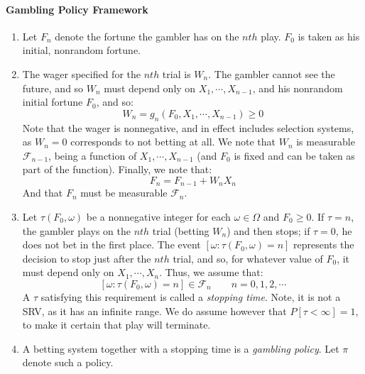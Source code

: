 \documentclass[12pt,a4paper]{article}
\newcommand{\1}[1]{\mathbbm{1}\left\{ #1 \right\}}
\newcommand{\fcal}{\mathcal{F}}
\begin{document}
\paragraph{Gambling Policy Framework}
\begin{enumerate}
	\item Let $F_n$ denote the fortune the gambler has on the $nth$ play. $F_0$ is taken as his initial, nonrandom fortune.
	
	\item The wager specified for the $nth$ trial is $W_n$. The gambler cannot see the future, and so $W_n$ must depend only on $X_1, \cdots, X_{n-1}$, and his nonrandom initial fortune $F_0$, and so:
	$$
		W_n = g_n(F_0, X_1, \cdots, X_{n-1}) \geq 0
	$$
	Note that the wager is nonnegative, and in effect includes selection systems, as $W_n = 0$ corresponds to not betting at all. We note that $W_n$ is measurable $\fcal_{n-1}$, being a function of $X_1, \cdots, X_{n-1}$ (and $F_0$ is fixed and can be taken as part of the function). Finally, we note that:
	$$
		F_n = F_{n-1} + W_nX_n
	$$
	And that $F_n$ must be measurable $\fcal_n$.
	
	\item Let $\tau(F_0,\omega)$ be a nonnegative integer for each $\omega \in \Omega$ and $F_0 \geq 0$. If $\tau = n$, the gambler plays on the $nth$ trial (betting $W_n$) and then stops; if $\tau = 0$, he does not bet in the first place. The event $\left[\omega: \tau(F_0, \omega) = n\right]$ represents the decision to stop just after the $nth$ trial, and so, for whatever value of $F_0$, it must depend only on $X_1, \cdots, X_n$. Thus, we assume that:
	$$
		\left[\omega : \tau(F_0,\omega) = n\right] \in \fcal_n \quad\quad n = 0, 1, 2, \cdots
	$$
	A $\tau$ satisfying this requirement is called a \textit{stopping time}. Note, it is not a SRV, as it has an infinite range. We do assume however that $P[\tau < \infty] = 1$, to make it certain that play will terminate.
	
	\item A betting system together with a stopping time is a \textit{gambling policy}. Let $\pi$ denote such a policy.
	

\end{enumerate}
\end{document}
